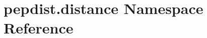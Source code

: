 \hypertarget{namespacepepdist_1_1distance}{}\section{pepdist.\+distance Namespace Reference}
\label{namespacepepdist_1_1distance}
